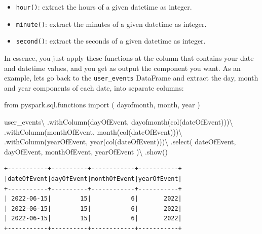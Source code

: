 \documentclass[
  11pt,
  letterpaper,
  DIV=11,
  numbers=noendperiod]{scrreprt}
\newenvironment{Shaded}{\begin{snugshade}}{\end{snugshade}}
\newcommand{\ImportTok}[1]{\textcolor[rgb]{0.00,0.46,0.62}{#1}}
\newcommand{\NormalTok}[1]{\textcolor[rgb]{0.00,0.23,0.31}{#1}}
\newcommand{\OperatorTok}[1]{\textcolor[rgb]{0.37,0.37,0.37}{#1}}
\newcommand{\StringTok}[1]{\textcolor[rgb]{0.13,0.47,0.30}{#1}}
\providecommand{\tightlist}{%
  \setlength{\itemsep}{0pt}\setlength{\parskip}{0pt}}\usepackage{longtable,booktabs,array}
\begin{document}
\begin{itemize}
\tightlist
\item
  \texttt{hour()}: extract the hours of a given datetime as integer.
\item
  \texttt{minute()}: extract the minutes of a given datetime as integer.
\item
  \texttt{second()}: extract the seconds of a given datetime as integer.
\end{itemize}

In essence, you just apply these functions at the column that contains
your date and datetime values, and you get as output the component you
want. As an example, lets go back to the \texttt{user\_events} DataFrame
and extract the day, month and year components of each date, into
separate columns:

\begin{Shaded}
\begin{Highlighting}[]
\ImportTok{from}\NormalTok{ pyspark.sql.functions }\ImportTok{import}\NormalTok{ (}
\NormalTok{    dayofmonth,}
\NormalTok{    month,}
\NormalTok{    year}
\NormalTok{)}

\NormalTok{user\_events}\OperatorTok{\textbackslash{}}
\NormalTok{    .withColumn(}\StringTok{\textquotesingle{}dayOfEvent\textquotesingle{}}\NormalTok{, dayofmonth(col(}\StringTok{\textquotesingle{}dateOfEvent\textquotesingle{}}\NormalTok{)))}\OperatorTok{\textbackslash{}}
\NormalTok{    .withColumn(}\StringTok{\textquotesingle{}monthOfEvent\textquotesingle{}}\NormalTok{, month(col(}\StringTok{\textquotesingle{}dateOfEvent\textquotesingle{}}\NormalTok{)))}\OperatorTok{\textbackslash{}}
\NormalTok{    .withColumn(}\StringTok{\textquotesingle{}yearOfEvent\textquotesingle{}}\NormalTok{, year(col(}\StringTok{\textquotesingle{}dateOfEvent\textquotesingle{}}\NormalTok{)))}\OperatorTok{\textbackslash{}}
\NormalTok{    .select(}
        \StringTok{\textquotesingle{}dateOfEvent\textquotesingle{}}\NormalTok{, }\StringTok{\textquotesingle{}dayOfEvent\textquotesingle{}}\NormalTok{,}
        \StringTok{\textquotesingle{}monthOfEvent\textquotesingle{}}\NormalTok{, }\StringTok{\textquotesingle{}yearOfEvent\textquotesingle{}}
\NormalTok{    )}\OperatorTok{\textbackslash{}}
\NormalTok{    .show()}
\end{Highlighting}
\end{Shaded}

\begin{verbatim}
+-----------+----------+------------+-----------+
|dateOfEvent|dayOfEvent|monthOfEvent|yearOfEvent|
+-----------+----------+------------+-----------+
| 2022-06-15|        15|           6|       2022|
| 2022-06-15|        15|           6|       2022|
| 2022-06-15|        15|           6|       2022|
+-----------+----------+------------+-----------+
\end{verbatim}
\end{document}
